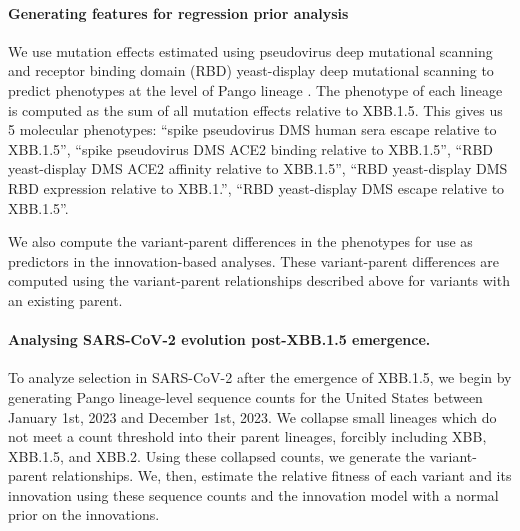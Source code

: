 %

\paragraph{Generating features for regression prior analysis}%

We use mutation effects estimated using pseudovirus deep mutational scanning and receptor binding domain (RBD) yeast-display deep mutational scanning to predict phenotypes at the level of Pango lineage \cite{Dadonaite2023, Taylor2023}.
The phenotype of each lineage is computed as the sum of all mutation effects relative to XBB.1.5.
This gives us 5 molecular phenotypes: ``spike pseudovirus DMS human sera escape relative to XBB.1.5'', ``spike pseudovirus DMS ACE2 binding relative to XBB.1.5'', ``RBD yeast-display DMS ACE2 affinity relative to XBB.1.5'', ``RBD yeast-display DMS RBD expression relative to XBB.1.'', ``RBD yeast-display DMS escape relative to XBB.1.5''.

We also compute the variant-parent differences in the phenotypes for use as predictors in the innovation-based analyses. 
These variant-parent differences are computed using the variant-parent relationships described above for variants with an existing parent.

\paragraph{Analysing SARS-CoV-2 evolution post-XBB.1.5 emergence.}

To analyze selection in SARS-CoV-2 after the emergence of XBB.1.5, we begin by generating Pango lineage-level sequence counts for the United States between January 1st, 2023 and December 1st, 2023. 
We collapse small lineages which do not meet a count threshold into their parent lineages, forcibly including XBB, XBB.1.5, and XBB.2.
Using these collapsed counts, we generate the variant-parent relationships.
We, then, estimate the relative fitness of each variant and its innovation using these sequence counts and the innovation model with a normal prior on the innovations.

